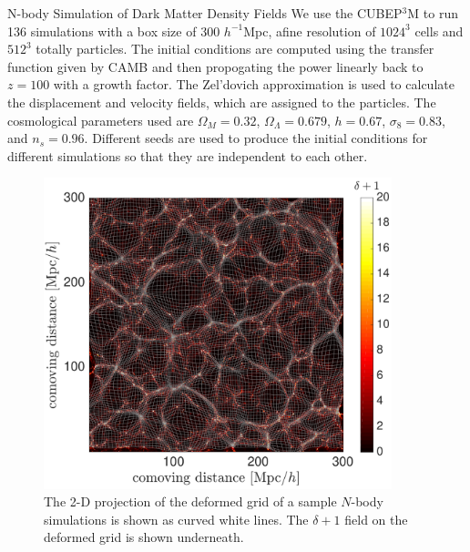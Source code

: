 \begin{section}{N-body Simulation of Dark Matter Density Fields}
  \label{sec:simulation}
    We use the \textsc{CUBEP$^3$M} \cite{bib:Harnois2013} to 
run 136 simulations with a box size of 300 $h^{-1}$Mpc, 
afine resolution of $1024^3$ cells and $512^3$ totally particles. The initial conditions are 
computed using the transfer function given by CAMB \cite{bib:Lewis2000} 
and then propogating the power linearly back to $z=100$ with a growth factor. The Zel'dovich approximation 
is used to calculate the displacement and velocity fields, which are 
assigned to the particles. The cosmological parameters used are $\Omega_M=0.32$, 
$\Omega_{\Lambda}=0.679$, $h=0.67$, $\sigma_8=0.83$, and $n_s=0.96$. Different seeds are used to produce 
the initial conditions for different simulations so that they are 
independent to each other.
\begin{figure}[t!]
\centering
 \includegraphics[width=0.9\textwidth]{sar_bbbest_analysis-crop.pdf}
   \caption{
The 2-D projection of the 
deformed grid of a sample $N$-body simulations is shown as curved white lines. The $\delta+1$ field 
on the deformed grid is shown underneath.}
 \label{fig:simandrec}
\end{figure}

\end{section}

